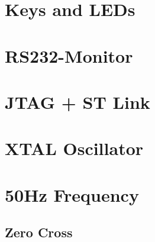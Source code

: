 \section{Keys and LEDs}
\label{sec: Keys and LEDs}


\section{RS232-Monitor}
\label{sec: RS232-Monitor}


\section{JTAG + ST Link}
\label{sec: JTAG + ST Link}


\section{XTAL Oscillator}
\label{sec: XTAL Oscillator}


\section{50Hz Frequency}
\label{sec: 50Hz Frequency}
\subsection{Zero Cross}
\label{subsec: Zero Cross}





